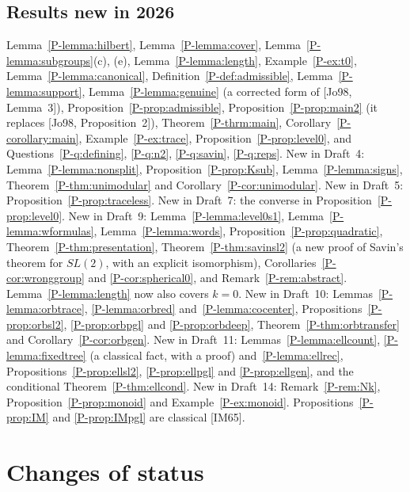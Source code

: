 \documentclass[12pt,letterpaper]{amsart}
\begin{document}
\subsection*{Results new in 2026}
Lemma~\ref{P-lemma:hilbert}, Lemma~\ref{P-lemma:cover},
Lemma~\ref{P-lemma:subgroups}(c), (e), Lemma~\ref{P-lemma:length},
Example~\ref{P-ex:t0}, Lemma~\ref{P-lemma:canonical},
Definition~\ref{P-def:admissible}, Lemma~\ref{P-lemma:support},
Lemma~\ref{P-lemma:genuine} (a corrected form of [Jo98, Lemma~3]),
Proposition~\ref{P-prop:admissible}, Proposition~\ref{P-prop:main2} (it
replaces [Jo98, Proposition~2]), Theorem~\ref{P-thrm:main},
Corollary~\ref{P-corollary:main}, Example~\ref{P-ex:trace},
Proposition~\ref{P-prop:level0}, and
Questions~\ref{P-q:defining}, \ref{P-q:n2}, \ref{P-q:savin},
\ref{P-q:reps}. New in Draft~4: Lemma~\ref{P-lemma:nonsplit},
Proposition~\ref{P-prop:Ksub}, Lemma~\ref{P-lemma:signs},
Theorem~\ref{P-thm:unimodular} and Corollary~\ref{P-cor:unimodular}.
New in Draft~5: Proposition~\ref{P-prop:traceless}. New in Draft~7:
the converse in Proposition~\ref{P-prop:level0}. New in Draft~9:
Lemma~\ref{P-lemma:level0s1}, Lemma~\ref{P-lemma:wformulas},
Lemma~\ref{P-lemma:words}, Proposition~\ref{P-prop:quadratic},
Theorem~\ref{P-thm:presentation}, Theorem~\ref{P-thm:savinsl2} (a new
proof of Savin's theorem for $SL(2)$, with an explicit isomorphism),
Corollaries~\ref{P-cor:wronggroup} and \ref{P-cor:spherical0}, and
Remark~\ref{P-rem:abstract}. Lemma~\ref{P-lemma:length} now also
covers $k=0$. New in Draft~10: Lemmas~\ref{P-lemma:orbtrace},
\ref{P-lemma:orbred} and~\ref{P-lemma:cocenter},
Propositions~\ref{P-prop:orbsl2}, \ref{P-prop:orbpgl} and
\ref{P-prop:orbdeep}, Theorem~\ref{P-thm:orbtransfer} and
Corollary~\ref{P-cor:orbgen}. New in Draft~11:
Lemmas~\ref{P-lemma:ellcount}, \ref{P-lemma:fixedtree} (a classical
fact, with a proof) and~\ref{P-lemma:ellrec},
Propositions~\ref{P-prop:ellsl2}, \ref{P-prop:ellpgl} and
\ref{P-prop:ellgen}, and the conditional
Theorem~\ref{P-thm:ellcond}. New in Draft~14:
Remark~\ref{P-rem:Nk}, Proposition~\ref{P-prop:monoid} and
Example~\ref{P-ex:monoid}. Propositions~\ref{P-prop:IM} and \ref{P-prop:IMpgl} are
classical [IM65].

\section{Changes of status}
\end{document}
